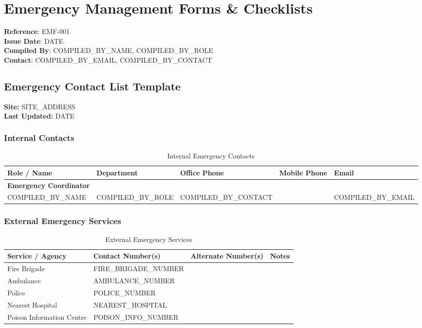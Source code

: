 \documentclass[11pt]{article}
\newcommand{\docTitle}{Emergency Management Forms \& Checklists}
\newcommand{\refNumber}{EMF-001}
\newcommand{\issueDate}{{{DATE}}}
\newcommand{\siteAddress}{{{SITE_ADDRESS}}}
\newcommand{\compilerName}{{{COMPILED_BY_NAME}}}
\newcommand{\compilerRole}{{{COMPILED_BY_ROLE}}}
\newcommand{\compilerEmail}{{{COMPILED_BY_EMAIL}}}
\newcommand{\compilerPhone}{{{COMPILED_BY_CONTACT}}}
\begin{document}
\section*{\docTitle}
\textbf{Reference}: \refNumber \\
\textbf{Issue Date}: \issueDate \\
\textbf{Compiled By}: \compilerName, \compilerRole \\
\textbf{Contact}: \compilerEmail, \compilerPhone

\subsection*{Emergency Contact List Template}

\textbf{Site:} \siteAddress \\
\textbf{Last Updated:} \issueDate

\subsubsection*{Internal Contacts}
\begin{table}[h]
    \centering
    \begin{tabular}{p{4cm}p{3cm}p{3cm}p{3cm}p{3cm}}
        \toprule
        \textbf{Role / Name} & \textbf{Department} & \textbf{Office Phone} & \textbf{Mobile Phone} & \textbf{Email} \\
        \midrule
        \textbf{Emergency Coordinator} & & & & \\
        \compilerName & \compilerRole & \compilerPhone & & \compilerEmail \\
        \bottomrule
    \end{tabular}
    \caption{Internal Emergency Contacts}
\end{table}

\subsubsection*{External Emergency Services}
\begin{table}[h]
    \centering
    \begin{tabular}{p{5cm}p{4cm}p{4cm}p{4cm}}
        \toprule
        \textbf{Service / Agency} & \textbf{Contact Number(s)} & \textbf{Alternate Number(s)} & \textbf{Notes} \\
        \midrule
        Fire Brigade & {{FIRE_BRIGADE_NUMBER}} & & \\
        Ambulance & {{AMBULANCE_NUMBER}} & & \\
        Police & {{POLICE_NUMBER}} & & \\
        Nearest Hospital & {{NEAREST_HOSPITAL}} & & \\
        Poison Information Centre & {{POISON_INFO_NUMBER}} & & \\
        \bottomrule
    \end{tabular}
    \caption{External Emergency Services}
\end{table}
\end{document}
